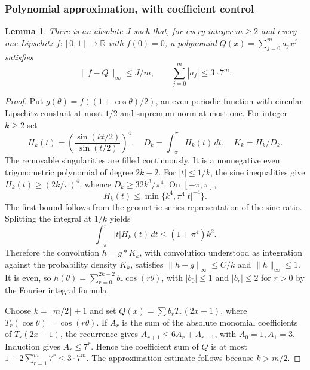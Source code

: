 \documentclass[11pt,a4paper]{article}
\newtheorem{lemma}[theorem]{Lemma}
\theoremstyle{definition}\newtheorem{definition}[theorem]{Definition}
\theoremstyle{remark}\newtheorem{remark}[theorem]{Remark}
\newcommand{\R}{\mathbb R}\newcommand{\C}{\mathbb C}\newcommand{\N}{\mathbb N}
\numberwithin{equation}{section}
\begin{document}
\subsubsection{Polynomial approximation, with coefficient control}
\begin{lemma}\label{M02-lem:jackson}
There is an absolute $J$ such that, for every integer $m\ge2$ and every one-Lipschitz $f:[0,1]\to\R$ with $f(0)=0$, a polynomial $Q(x)=\sum_{j=0}^m a_jx^j$ satisfies
\[
 \|f-Q\|_\infty\le J/m,\qquad
 \sum_{j=0}^m|a_j|\le3\cdot7^m.
\]
\end{lemma}
\begin{proof}
Put $g(\theta)=f((1+\cos\theta)/2)$, an even periodic function with circular Lipschitz constant at most $1/2$ and supremum norm at most one. For integer $k\ge2$ set
\[
 H_k(t)=\left(\frac{\sin(kt/2)}{\sin(t/2)}\right)^4,
 \quad D_k=\int_{-\pi}^{\pi}H_k(t)\,dt,
 \quad K_k=H_k/D_k.
\]
The removable singularities are filled continuously. It is a nonnegative even trigonometric polynomial of degree $2k-2$. For $|t|\le1/k$, the sine inequalities give $H_k(t)\ge(2k/\pi)^4$, whence $D_k\ge32k^3/\pi^4$. On $[-\pi,\pi]$,
\[
 H_k(t)\le\min\{k^4,\pi^4|t|^{-4}\}.
\]
The first bound follows from the geometric-series representation of the sine ratio. Splitting the integral at $1/k$ yields
\[
 \int_{-\pi}^{\pi}|t|H_k(t)\,dt
 \le(1+\pi^4)k^2.
\]
Therefore the convolution $h=g*K_k$, with convolution understood as integration against the probability density $K_k$, satisfies $\|h-g\|_\infty\le C/k$ and $\|h\|_\infty\le1$. It is even, so
$h(\theta)=\sum_{r=0}^{2k-2}b_r\cos(r\theta)$, with $|b_0|\le1$ and $|b_r|\le2$ for $r>0$ by the Fourier integral formula.

Choose $k=\lfloor m/2\rfloor+1$ and set $Q(x)=\sum b_rT_r(2x-1)$, where $T_r(\cos\theta)=\cos(r\theta)$. If $A_r$ is the sum of the absolute monomial coefficients of $T_r(2x-1)$, the recurrence gives
$A_{r+1}\le6A_r+A_{r-1}$, with $A_0=1,A_1=3$. Induction gives $A_r\le7^r$. Hence the coefficient sum of $Q$ is at most
$1+2\sum_{r=1}^m7^r\le3\cdot7^m$. The approximation estimate follows because $k>m/2$.
\end{proof}
\end{document}
